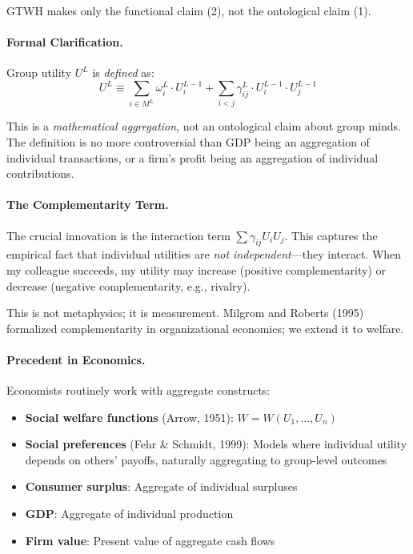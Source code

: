 \documentclass[12pt,a4paper]{article}
\begin{document}
GTWH makes only the functional claim (2), not the ontological claim (1).

\paragraph{Formal Clarification.}

Group utility $U^L$ is \textit{defined} as:
\begin{equation}
U^L \equiv \sum_{i \in M^L} \omega^L_i \cdot U^{L-1}_i + \sum_{i < j} \gamma^L_{ij} \cdot U^{L-1}_i \cdot U^{L-1}_j
\end{equation}

This is a \textit{mathematical aggregation}, not an ontological claim about group minds. 
The definition is no more controversial than GDP being an aggregation of individual 
transactions, or a firm's profit being an aggregation of individual contributions.

\paragraph{The Complementarity Term.}

The crucial innovation is the interaction term $\sum \gamma_{ij} U_i U_j$. 
This captures the empirical fact that individual utilities are \textit{not 
independent}---they interact. When my colleague succeeds, my utility may 
increase (positive complementarity) or decrease (negative complementarity, 
e.g., rivalry).

This is not metaphysics; it is measurement. Milgrom and Roberts (1995) 
formalized complementarity in organizational economics; we extend it to welfare.

\paragraph{Precedent in Economics.}

Economists routinely work with aggregate constructs:
\begin{itemize}[nosep]
\item \textbf{Social welfare functions} (Arrow, 1951): $W = W(U_1, ..., U_n)$
\item \textbf{Social preferences} (Fehr \& Schmidt, 1999): Models where individual 
utility depends on others' payoffs, naturally aggregating to group-level outcomes
\item \textbf{Consumer surplus}: Aggregate of individual surpluses
\item \textbf{GDP}: Aggregate of individual production
\item \textbf{Firm value}: Present value of aggregate cash flows
\end{itemize}
\end{document}
